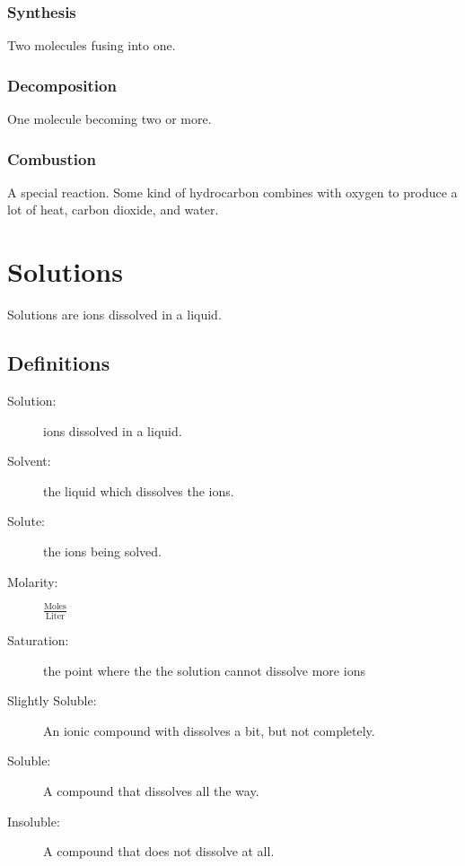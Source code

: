 \documentclass[]{article}
\begin{document}
\subsubsection{Synthesis}
Two molecules fusing into one. 
\subsubsection{Decomposition}
One molecule becoming two or more. 
\subsubsection{Combustion}
A special reaction. Some kind of hydrocarbon combines with oxygen to produce a lot of heat, carbon dioxide, and water.

\section{Solutions}
Solutions are ions dissolved in a liquid.
\subsection{Definitions}
\begin{description}
\item[Solution:] ions dissolved in a liquid.
\item[Solvent:] the liquid which dissolves the ions.
\item[Solute:] the ions being solved.
\item[Molarity:] $ \frac{\text{Moles}}{\text{Liter}} $
\item[Saturation:] the point where the the solution cannot dissolve more ions
\item[Slightly Soluble:] An ionic compound with dissolves a bit, but not completely.
\item[Soluble:] A compound that dissolves all the way.
\item[Insoluble:] A compound that does not dissolve at all.
\end{description}
\end{document}
